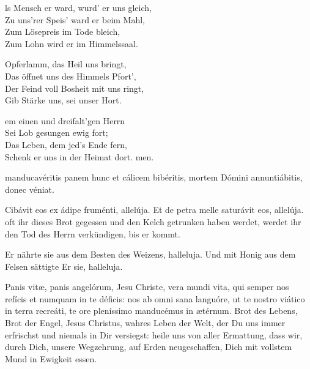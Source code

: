 \documentclass[fontsize=10pt,paper=A5,twoside,BCOR=1mm,DIV=21,headinclude]{scrarticle}
\begin{document}
\begin{paracol}{2}
\begin{hymnus}
ls Mensch er ward, wurd' er uns gleich,\\
Zu uns'rer Speis' ward er beim Mahl,\\
Zum Lösepreis im Tode bleich,\\
Zum Lohn wird er im Himmelssaal.

 Opferlamm, das Heil uns bringt,\\
Das öffnet uns des Himmels Pfort',\\
Der Feind voll Bosheit mit uns ringt,\\
Gib Stärke uns, sei unser Hort.

em einen und dreifalt'gen Herrn\\
Sei Lob gesungen ewig fort;\\
Das Leben, dem jed's Ende fern,\\
Schenk er uns in der Heimat dort.
men.
\end{hymnus}
\end{paracol}

\vspace{-.1em}



\begin{paracol}{2}\pcb 
{} manducavéritis panem hunc et cálicem bibéritis, mortem Dómini annuntiábitis, donec véniat.

\V Cibávit eos ex ádipe fruménti, allelúja.
\R Et de petra melle saturávit eos, allelúja.
	\switchcolumn
	 oft ihr dieses Brot gegessen und den Kelch getrunken haben werdet, werdet ihr den Tod des Herrn verkündigen, bis er kommt.

\V Er nährte sie aus dem Besten des Weizens, halleluja.
\R Und mit Honig aus dem Felsen sättigte Er sie, halleluja.
\end{paracol}

\vspace{-.1em}


\vspace{.3em}

\begin{paracol}{2}\pcb
\A Panis vitæ, panis angelórum, Jesu Christe, vera mundi vita, qui semper nos refícis et numquam in te déficis: nos ab omni sana languóre, ut te nostro viático in terra recreáti, te ore pleníssimo manducémus in ætérnum.
	\switchcolumn
	\A Brot des Lebens, Brot der Engel, Jesus Christus, wahres Leben der Welt, der Du uns immer erfrischst und niemals in Dir versiegst: heile uns von aller Ermattung, dass wir, durch Dich, unsere Wegzehrung, auf Erden neugeschaffen, Dich mit vollstem Mund in Ewigkeit essen.
\end{paracol}
\end{document}
